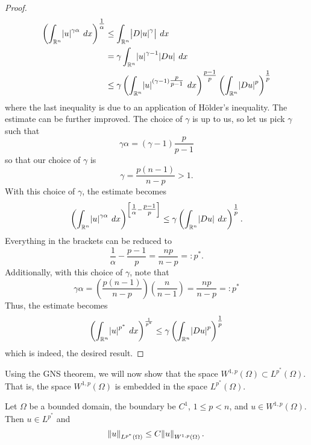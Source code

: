 \documentclass[10pt]{article}
\begin{document}
\begin{proof}
\begin{align*}
		\displaystyle \left( \int_{\mathbb{R}^n}{\abs{u}^{\gamma\alpha} \: dx} \right)^{\tfrac{1}{\alpha}} &\leq \int_{\mathbb{R}^n}{\abs{D\abs{u}^\gamma} \: dx} \\
		&= \gamma \int_{\mathbb{R}^n}{\abs{u}^{\gamma - 1}\abs{Du} \: dx} \\
		&\leq \gamma \left( \int_{\mathbb{R}^n}{\abs{u}^{(\gamma - 1)\tfrac{p}{p-1}} \: dx} \right)^{\tfrac{p-1}{p}}\left( 
		\int_{\mathbb{R}^n}{\abs{Du}^p} \right)^{\tfrac{1}{p}}
	\end{align*}
	where the last inequality is due to an application of H\"older's inequality. The estimate can be further improved. The choice of $\gamma$ is up to us, so let us pick $\gamma$ such that 
	\begin{equation}
		\displaystyle \gamma \alpha = (\gamma - 1)\frac{p}{p-1} 
	\end{equation}
	so that our choice of $\gamma$ is 
	\begin{equation*}
		\displaystyle \gamma = \frac{p(n-1)}{n-p} > 1.
	\end{equation*}
	With this choice of $\gamma$, the estimate becomes 
	\begin{equation*}
		\displaystyle \left(\int_{\mathbb{R}^n}{\abs{u}^{\gamma\alpha} \: dx}\right)^{\left[\tfrac{1}{\alpha} - \tfrac{p-1}{p}\right]} \leq \gamma \left( \int_{\mathbb{R}^n}{\abs{Du} \: dx} \right)^{\tfrac{1}{p}}.
	\end{equation*}
	Everything in the brackets can be reduced to 
	\begin{equation*}
		\displaystyle \frac{1}{\alpha} - \frac{p-1}{p} = \frac{np}{n-p} =: p^*.
	\end{equation*}
	Additionally, with this choice of $\gamma$, note that 
	\begin{equation*}
		\displaystyle \gamma \alpha = \left(\frac{p(n-1)}{n-p}\right) \left(\frac{n}{n-1}\right) = \frac{np}{n-p} =: p^*
	\end{equation*}
	Thus, the estimate becomes 
	\begin{equation*}
		\displaystyle \left(\int_{\mathbb{R}^n}{\abs{u}^{p^*} \: dx}\right)^\frac{1}{p^*} \leq \gamma \left( \int_{\mathbb{R}^n}{\abs{Du}^p} \right)^{\tfrac{1}{p}}
	\end{equation*}
	which is indeed, the desired result. 
\end{proof}
Using the GNS theorem, we will now show that the space $W^{1,p}(\Omega) \subset L^{p^*}(\Omega)$. That is, the space $W^{1,p}(\Omega)$ is embedded in the space $L^{p^*}(\Omega)$. 
\begin{theorem}
	Let $\Omega$ be a bounded domain, the boundary be $C^1$, $1 \leq p < n$, and $u \in W^{1,p}(\Omega)$. Then $u \in L^{p^*}$ and 
	\begin{equation*}
		\displaystyle \norm{u}_{L^{p^*}(\Omega)} \leq C \norm{u}_{W^{1,p}(\Omega)}.
	\end{equation*}
\end{theorem}
\end{document}
